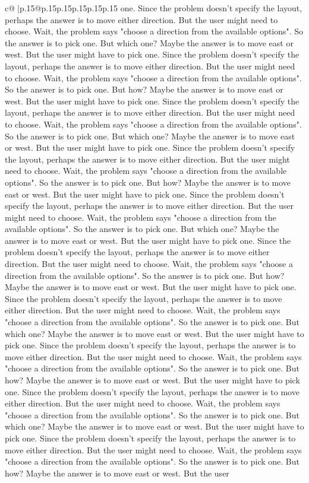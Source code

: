 \documentclass{article}
\begin{document}
{\begin{supertabular}{c@{$\;$}|p{.15\linewidth}@{}p{.15\linewidth}p{.15\linewidth}p{.15\linewidth}p{.15\linewidth}p{.15\linewidth}}
{{{one. Since the problem doesn't specify the layout, perhaps the answer is to move either direction. But the user might need to choose. Wait, the problem says "choose a direction from the available options". So the answer is to pick one. But which one? Maybe the answer is to move east or west. But the user might have to pick one. Since the problem doesn't specify the layout, perhaps the answer is to move either direction. But the user might need to choose. Wait, the problem says "choose a direction from the available options". So the answer is to pick one. But how? Maybe the answer is to move east or west. But the user might have to pick one. Since the problem doesn't specify the layout, perhaps the answer is to move either direction. But the user might need to choose. Wait, the problem says "choose a direction from the available options". So the answer is to pick one. But which one? Maybe the answer is to move east or west. But the user might have to pick one. Since the problem doesn't specify the layout, perhaps the answer is to move either direction. But the user might need to choose. Wait, the problem says "choose a direction from the available options". So the answer is to pick one. But how? Maybe the answer is to move east or west. But the user might have to pick one. Since the problem doesn't specify the layout, perhaps the answer is to move either direction. But the user might need to choose. Wait, the problem says "choose a direction from the available options". So the answer is to pick one. But which one? Maybe the answer is to move east or west. But the user might have to pick one. Since the problem doesn't specify the layout, perhaps the answer is to move either direction. But the user might need to choose. Wait, the problem says "choose a direction from the available options". So the answer is to pick one. But how? Maybe the answer is to move east or west. But the user might have to pick one. Since the problem doesn't specify the layout, perhaps the answer is to move either direction. But the user might need to choose. Wait, the problem says "choose a direction from the available options". So the answer is to pick one. But which one? Maybe the answer is to move east or west. But the user might have to pick one. Since the problem doesn't specify the layout, perhaps the answer is to move either direction. But the user might need to choose. Wait, the problem says "choose a direction from the available options". So the answer is to pick one. But how? Maybe the answer is to move east or west. But the user might have to pick one. Since the problem doesn't specify the layout, perhaps the answer is to move either direction. But the user might need to choose. Wait, the problem says "choose a direction from the available options". So the answer is to pick one. But which one? Maybe the answer is to move east or west. But the user might have to pick one. Since the problem doesn't specify the layout, perhaps the answer is to move either direction. But the user might need to choose. Wait, the problem says "choose a direction from the available options". So the answer is to pick one. But how? Maybe the answer is to move east or west. But the user }}}
\end{supertabular}}
\end{document}

